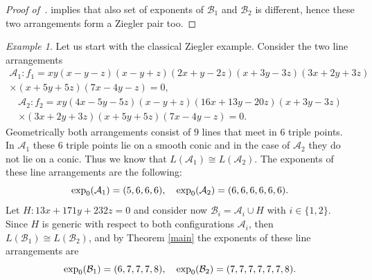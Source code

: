 \documentclass[a4paper,11pt]{amsart}
\def\A{{\mathcal{A}}}%
\def\B{{\mathcal{B}}}%
\numberwithin{equation}{section}
\theoremstyle{remark}
\newtheorem{example}[theorem]{Example}
\begin{document}
\begin{proof}[Proof of~]
 implies that also set of exponents of $\B_1$ and $\B_2$ is different, hence these two arrangements form a Ziegler pair too.
\end{proof}
\begin{example}
\label{ziegclas}
Let us start with the classical Ziegler example. Consider the two line arrangements 
\begin{multline*}
\mathcal{A}_{1} : f_{1}=xy(x-y-z)(x-y+z)(2x+y-2z)(x+3y-3z)(3x+2y+3z) \\ \times (x+5y+5z)(7x-4y-z) =0 ,
\end{multline*}
\begin{multline*}
\mathcal{A}_{2}: f_{2}=xy(4x-5y-5z)(x-y+z)(16x+13y-20z)(x+3y-3z)\\ \times (3x+2y+3z) (x+5y+5z)(7x-4y-z)=0.
\end{multline*}
Geometrically both arrangements consist of $9$ lines that meet in $6$ triple points.
In $\A_1$ these $6$ triple points lie on a smooth conic and in the case of $\A_2$ they do not lie on a conic.
Thus we know that $L(\mathcal{A}_{1}) \cong L(\mathcal{A}_{2})$.
The exponents of these line arrangements are the following:
$${\rm exp}_{0}(\mathcal{A}_{1}) = (5,6,6,6), {\quad \rm exp}_{0}(\mathcal{A}_{2}) = (6,6,6,6,6,6).$$ Let $H : 13x+171y+232z=0$ and consider now $\mathcal{B}_{i} = \mathcal{A}_{i} \cup H$ with $i \in \{1,2\}$.
Since $H$ is generic with respect to both configurations $\mathcal{A}_{i}$, then $L(\mathcal{B}_{1}) \cong L(\mathcal{B}_{2})$, and by Theorem \ref{main} the exponents of these line arrangements are 
$${\rm exp}_{0}(\mathcal{B}_{1}) = (6,7,7,7,8), \quad {\rm exp}_{0}(\mathcal{B}_{2}) = (7,7,7,7,7,7,8).$$
\end{example}
\end{document}
